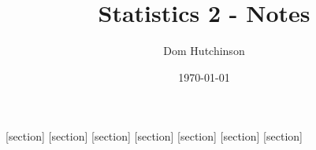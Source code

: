 \documentclass[11pt,a4paper]{article}
\begin{document}
\pagestyle{fancy}
\setlength\parindent{0pt}
\allowdisplaybreaks

\renewcommand{\headrulewidth}{0pt}

\title{Statistics 2 - Notes}
\author{Dom Hutchinson}
\date{\today}
\maketitle

\fancyhead[R]{\today}

[section]
[section]
[section]
[section]
[section]
[section]
[section]

\newcommand{\dotprod}[0]{\boldsymbol{\cdot}}
\newcommand{\cosech}[0]{\mathrm{cosech}\ }
\newcommand{\cosec}[0]{\mathrm{cosec}\ }
\newcommand{\sech}[0]{\mathrm{sech}\ }
\newcommand{\prob}[0]{\mathbb{P}}
\newcommand{\nats}[0]{\mathbb{N}}
\newcommand{\cov}[0]{\mathrm{Cov}}
\newcommand{\var}[0]{\mathrm{Var}}
\newcommand{\expect}[0]{\mathbb{E}}
\newcommand{\reals}[0]{\mathbb{R}}
\newcommand{\integers}[0]{\mathbb{Z}}
\newcommand{\indicator}[0]{\mathds{1}}
\newcommand{\nb}[0]{\textit{N.B.} }
\newcommand{\ie}[0]{\textit{i.e.} }
\newcommand{\eg}[0]{\textit{e.g.} }
\newcommand{\X}[0]{\textbf{X}}
\newcommand{\x}[0]{\textbf{x}}
\newcommand{\iid}[0]{\overset{\text{iid}}{\sim}}
\newcommand{\proved}[0]{$\hfill\square$\\}
\end{document}
